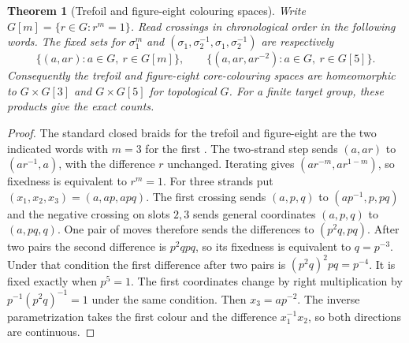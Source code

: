 \documentclass[11pt,reqno]{amsart}
\newtheorem{theorem}{Theorem}[section]
\theoremstyle{definition}
\theoremstyle{remark}
\numberwithin{equation}{section}
\begin{document}
\begin{theorem}[Trefoil and figure-eight colouring spaces]\label{m7:knot-roots}
Write $G[m]=\{r\in G:r^m=1\}$. Read crossings in chronological order
in the following words. The fixed sets for $\sigma_1^m$ and
$(\sigma_1,\sigma_2^{-1},\sigma_1,\sigma_2^{-1})$ are respectively
\[
 \{(a,ar):a\in G,\ r\in G[m]\},\qquad
 \{(a,ar,ar^{-2}):a\in G,\ r\in G[5]\}.
\]
Consequently the trefoil and figure-eight core-colouring spaces are
homeomorphic to $G\times G[3]$ and $G\times G[5]$ for topological $G$.
For a finite target group, these products give the exact counts.
\end{theorem}
\begin{proof}
The standard closed braids for the trefoil and figure-eight are the
two indicated words with $m=3$ for the first
\cite[Ch.~1]{m7:Birman}. The two-strand step sends $(a,ar)$ to
$(ar^{-1},a)$, with the difference $r$ unchanged. Iterating gives
$(ar^{-m},ar^{1-m})$, so fixedness is equivalent to $r^m=1$.
For three strands put $(x_1,x_2,x_3)=(a,ap,apq)$.
The first crossing sends $(a,p,q)$ to $(ap^{-1},p,pq)$ and the
negative crossing on slots $2,3$ sends general coordinates
$(a,p,q)$ to $(a,pq,q)$. One pair of moves therefore sends the
differences to $(p^2q,pq)$. After two pairs the second difference
is $p^2qpq$, so its fixedness is equivalent to $q=p^{-3}$.
Under that condition the first difference after two pairs is
$(p^2q)^2pq=p^{-4}$. It is fixed exactly when $p^5=1$.
The first coordinates change by right multiplication by
$p^{-1}(p^2q)^{-1}=1$ under the same condition. Then
$x_3=ap^{-2}$. The inverse parametrization takes the first colour and the
difference $x_1^{-1}x_2$, so both directions are continuous.
\end{proof}
\end{document}
